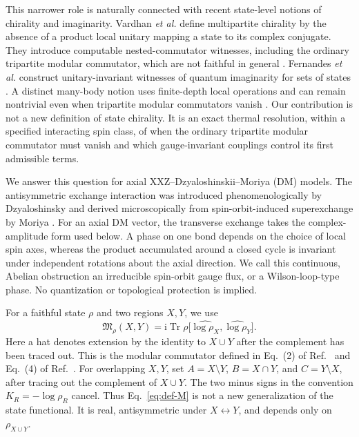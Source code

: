 \documentclass[11pt]{article}
\newcommand{\Tr}{\operatorname{Tr}}
\newcommand{\Mmod}{\mathfrak{M}}
\newcommand{\ii}{\mathrm{i}}
\begin{document}
This narrower role is naturally connected with recent state-level notions of
chirality and imaginarity.  Vardhan \textit{et al.} define multipartite
chirality by the absence of a product local unitary mapping a state to its
complex conjugate.  They introduce computable nested-commutator witnesses,
including the ordinary tripartite modular commutator, which are not faithful
in general \cite{VardhanEtAl2026}.  Fernandes \textit{et al.} construct
unitary-invariant witnesses of quantum imaginarity for sets of states
\cite{FernandesEtAl2024}.  A distinct many-body notion uses finite-depth
local operations and can remain nontrivial even when tripartite modular
commutators vanish \cite{EllisonEtAl2026}.  Our contribution is not a new
definition of state chirality.  It is an exact thermal resolution, within a
specified interacting spin class, of when the ordinary tripartite modular
commutator must vanish and which gauge-invariant couplings control its first
admissible terms.

We answer this question for axial XXZ--Dzyaloshinskii--Moriya (DM) models.
The antisymmetric exchange interaction was introduced phenomenologically by
Dzyaloshinsky and derived microscopically from spin-orbit-induced
superexchange by Moriya \cite{Dzyaloshinsky1958,Moriya1960}.  For an axial DM
vector, the transverse exchange takes the complex-amplitude form used below.
A phase on one bond depends on the
choice of local spin axes, whereas the product accumulated around a closed
cycle is invariant under independent rotations about the axial direction.
We call this continuous, Abelian obstruction an irreducible spin-orbit gauge
flux, or a Wilson-loop-type phase.  No quantization or topological protection
is implied.

For a faithful state $\rho$ and two regions $X,Y$, we use
\begin{equation}
 \Mmod_\rho(X,Y)
 =\ii\Tr\rho
 \bigl[\widehat{\log\rho_X},\widehat{\log\rho_Y}\bigr].
 \label{eq:def-M}
\end{equation}
Here a hat denotes extension by the identity to $X\cup Y$ after the
complement has been traced out.
This is the modular commutator defined in Eq.~(2) of
Ref.~\cite{KimEtAl2022PRL} and Eq.~(4) of
Ref.~\cite{KimEtAl2022PRB}.  For overlapping $X,Y$, set
$A=X\setminus Y$, $B=X\cap Y$, and $C=Y\setminus X$, after tracing out the
complement of $X\cup Y$.  The two minus signs in the convention
$K_R=-\log\rho_R$ cancel.  Thus Eq.~\eqref{eq:def-M} is not a new
generalization of the state functional.  It is real, antisymmetric under
$X\leftrightarrow Y$, and depends only on $\rho_{X\cup Y}$.
\end{document}
